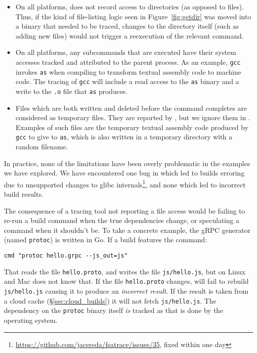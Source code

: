\begin{itemize}
\item On all platforms, \Fsatrace does not record access to directories (as opposed to files). Thus, if the kind of file-listing logic seen in Figure~\ref{fig:getdir} was moved into a binary that needed to be traced, changes to the directory itself (such as adding new files) would not trigger a reexecution of the relevant command.
\item On all platforms, any subcommands that are executed have their system accesses tracked and attributed to the parent process. As an example, \texttt{gcc} invokes \texttt{as} when compiling to transform textual assembly code to machine code. The tracing of \texttt{gcc} will include a read access to the \texttt{as} binary and a write to the \texttt{.o} file that \texttt{as} produces.
\item Files which are both written and deleted before the command completes are considered as temporary files. They are reported by \Fsatrace, but we ignore them in \Rattle. Examples of such files are the temporary textual assembly code produced by \texttt{gcc} to give to \texttt{as}, which is also written in a temporary directory with a random filename.
\end{itemize}

\noindent In practice, none of the limitations have been overly
problematic in the examples we have explored. We have encountered one
bug in \Fsatrace which led to builds erroring due to unsupported
changes to glibc
internals\footnote{\url{https://github.com/jacereda/fsatrace/issues/35},
  fixed within one day}, and none which led to incorrect build
results.

The consequence of a tracing tool not reporting a file access would be failing to re-run a build command when the true dependencies change, or speculating a command when it shouldn't be. To take a concrete example, the gRPC generator (named \texttt{protoc}) is written in Go. If a \Rattle build features the command:

\begin{verbatim}
cmd "protoc hello.grpc --js_out=js"
\end{verbatim}

That reads the file \texttt{hello.proto}, and writes the file \texttt{js/hello.js}, but on Linux and Mac \Rattle does not know that. If the file \texttt{hello.proto} changes, \Rattle will fail to rebuild \texttt{js/hello.js} causing it to produce an \emph{incorrect result}. If the result is taken from a cloud cache (\S\ref{sec:cloud_builds}) it will not fetch \texttt{js/hello.js}. The dependency on the \texttt{protoc} binary itself \emph{is} tracked as that is done by the operating system.

